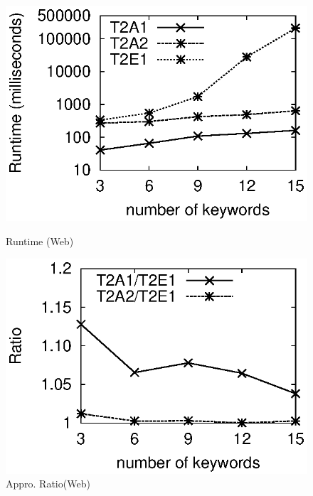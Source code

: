 \documentclass{sig-alternate}
\begin{document}
\begin{figure}[h]
\vspace{-1ex}
\begin{minipage}[bt]{1.6in}
 \includegraphics[scale=0.5]{figure/Webtime2}\vspace{-2ex}
\caption{Runtime (Web)} \label{fig:webtime2}
\end{minipage}\hspace{2mm}
\begin{minipage}[bt]{1.6in}
 \includegraphics[scale=0.5]{figure/Webratio2}\vspace{-2ex}
\caption{Appro. Ratio(Web)} \label{fig:webratio2}
\end{minipage}
\end{figure}\vspace{-4ex}
\end{document}
